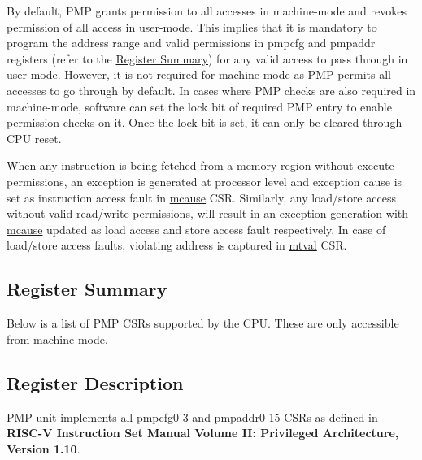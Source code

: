 \documentclass[main\_\_EN.tex]{subfiles}
\begin{document}
By default, PMP grants permission to all accesses in machine-mode and revokes permission of all access in user-mode. This implies that it is mandatory to program the address range and valid permissions in pmpcfg and pmpaddr registers (refer to the \hyperref[sec:riscvcpu-pmp-reg-summ]{Register Summary}) for any valid access to pass through in user-mode. However, it is not required for machine-mode as PMP permits all accesses to go through by default. In cases where PMP checks are also required in machine-mode, software can set the lock bit of required PMP entry to enable permission checks on it. Once the lock bit is set, it can only be cleared through CPU reset.

When any instruction is being fetched from a memory region without execute permissions, an exception is generated at processor level and exception cause is set as instruction access fault in \hyperref[regdesc:MCAUSE]{mcause} CSR. Similarly, any load/store access without valid read/write permissions, will result in an exception generation with \hyperref[regdesc:MCAUSE]{mcause} updated as load access and store access fault respectively. In case of load/store access faults, violating address is captured in \hyperref[regdesc:MTVAL]{mtval} CSR.


\clearpage
\hypertarget{riscvcpu-pmp-reg-summ}{}
\subsection{Register Summary}
\label{sec:riscvcpu-pmp-reg-summ}


Below is a list of PMP CSRs supported by the CPU. These are only accessible from machine mode.




\subsection{Register Description}
\label{sec:riscvcpu-pmp-reg-desc}

PMP unit implements all pmpcfg0-3 and pmpaddr0-15 CSRs as defined in \textbf{RISC-V Instruction Set Manual Volume II: Privileged Architecture, Version 1.10}.

\end{document}
